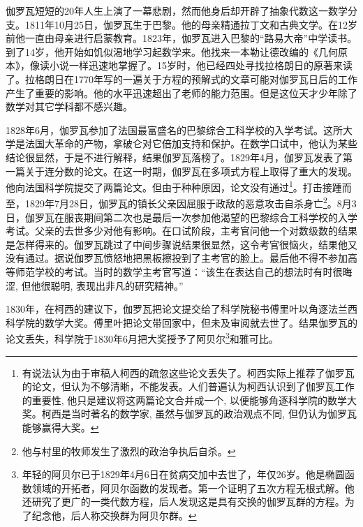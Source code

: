 \documentclass[b5paper]{ctexart}
\begin{document}
伽罗瓦短短的20年人生上演了一幕悲剧，然而他身后却开辟了抽象代数这一数学分支。1811年10月25日，伽罗瓦生于巴黎。他的母亲精通拉丁文和古典文学。在12岁前他一直由母亲进行启蒙教育。1823年，伽罗瓦进入巴黎的“路易大帝”中学读书。到了14岁，他开始如饥似渴地学习起数学来。他找来一本勒让德改编的《几何原本》，像读小说一样迅速地掌握了。15岁时，他已经四处寻找拉格朗日的原著来读了。拉格朗日在1770年写的一遍关于方程的预解式的文章可能对伽罗瓦日后的工作产生了重要的影响。他的水平迅速超出了老师的能力范围。但是这位天才少年除了数学对其它学科都不感兴趣。

1828年6月，伽罗瓦参加了法国最富盛名的巴黎综合工科学校的入学考试。这所大学是法国大革命的产物，拿破仑对它倍加支持和保护。在数学口试中，他认为某些结论很显然，于是不进行解释，结果伽罗瓦落榜了。1829年4月，伽罗瓦发表了第一篇关于连分数的论文。在这一时期，伽罗瓦在多项式方程上取得了重大的发现。他向法国科学院提交了两篇论文。但由于种种原因，论文没有通过\footnote{有说法认为由于审稿人柯西的疏忽这些论文丢失了。柯西实际上推荐了伽罗瓦的论文，但认为不够清晰，不能发表。人们普遍认为柯西认识到了伽罗瓦工作的重要性, 他只是建议将这两篇论文合并成一个, 以便能够角逐科学院的数学大奖。柯西是当时著名的数学家, 虽然与伽罗瓦的政治观点不同, 但仍认为伽罗瓦能够赢得大奖。\cite{Wiki-Galois}}。打击接踵而至，1829年7月28日，伽罗瓦的镇长父亲因屈服于政敌的恶意攻击自杀身亡\footnote{他与村里的牧师发生了激烈的政治争执后自杀\cite{Wiki-Galois}。}。8月3日，伽罗瓦在服丧期间第二次也是最后一次参加他渴望的巴黎综合工科学校的入学考试。父亲的去世多少对他有影响。在口试阶段，主考官问他一个对数级数的结果是怎样得来的。伽罗瓦跳过了中间步骤说结果很显然，这令考官很恼火，结果他又没有通过。据说伽罗瓦愤怒地把黑板擦投到了主考官的脸上。最后他不得不参加高等师范学校的考试。当时的数学主考官写道：“该生在表达自己的想法时有时很晦涩, 但他很聪明, 表现出非凡的研究精神。”

1830年，在柯西的建议下，伽罗瓦把论文提交给了科学院秘书傅里叶以角逐法兰西科学院的数学大奖。傅里叶把论文带回家中，但未及审阅就去世了。结果伽罗瓦的论文丢失，科学院于1830年6月把大奖授予了阿贝尔\footnote{年轻的阿贝尔已于1829年4月6日在贫病交加中去世了，年仅26岁。他是椭圆函数领域的开拓者，阿贝尔函数的发现者。第一个证明了五次方程无根式解。他还研究了更广的一类代数方程，后人发现这是具有交换的伽罗瓦群的方程。为了纪念他，后人称交换群为阿贝尔群。}和雅可比\cite{HanXueTao2009}。
\end{document}
